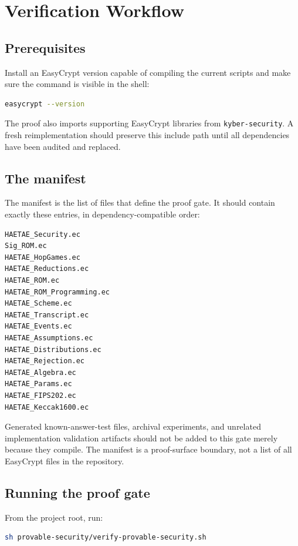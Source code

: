 \documentclass[11pt]{report}
\DeclareRobustCommand{\file}[1]{\ifmmode\text{\nolinkurl{#1}}\else\nolinkurl{#1}\fi}
\theoremstyle{definition}
\theoremstyle{plain}
\begin{document}
\chapter{Verification Workflow}

\section{Prerequisites}

Install an EasyCrypt version capable of compiling the current scripts and make
sure the command is visible in the shell:

\begin{lstlisting}[language=bash]
easycrypt --version
\end{lstlisting}

The proof also imports supporting EasyCrypt libraries from
\file{kyber-security}.  A fresh reimplementation should preserve this include
path until all dependencies have been audited and replaced.

\section{The manifest}

The manifest is the list of files that define the proof gate.  It should contain
exactly these entries, in dependency-compatible order:

\begin{lstlisting}
HAETAE_Security.ec
Sig_ROM.ec
HAETAE_HopGames.ec
HAETAE_Reductions.ec
HAETAE_ROM.ec
HAETAE_ROM_Programming.ec
HAETAE_Scheme.ec
HAETAE_Transcript.ec
HAETAE_Events.ec
HAETAE_Assumptions.ec
HAETAE_Distributions.ec
HAETAE_Rejection.ec
HAETAE_Algebra.ec
HAETAE_Params.ec
HAETAE_FIPS202.ec
HAETAE_Keccak1600.ec
\end{lstlisting}

Generated known-answer-test files, archival experiments, and unrelated
implementation validation artifacts should not be added to this gate merely
because they compile.  The manifest is a proof-surface boundary, not a list of
all EasyCrypt files in the repository.

\section{Running the proof gate}

From the project root, run:

\begin{lstlisting}[language=bash]
sh provable-security/verify-provable-security.sh
\end{lstlisting}
\end{document}
